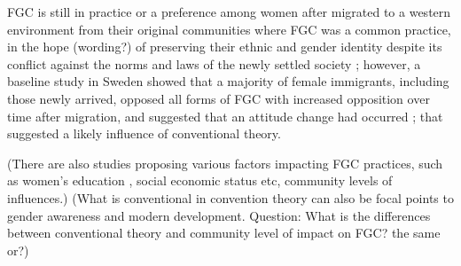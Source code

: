 \documentclass[12pt,]{article}
\begin{document}
FGC is still in practice or a preference among women after migrated to a western environment from their original communities where FGC was a common practice, in the hope (wording?) of preserving their ethnic and gender identity despite its conflict against the  norms and laws of the newly settled society \cite{}; however, a baseline study in Sweden showed that a majority of female immigrants, including those newly arrived, opposed all forms of FGC with increased opposition over time after migration, and suggested that an attitude change had occurred \cite{WahlJohn17}; that suggested a likely influence of conventional theory.


(There are also studies proposing various factors impacting FGC practices, such as women's education \cite{KandNwak09,VanMeek15}, social economic status \cite{} etc, community levels of influences.) (What is conventional in convention theory can also be focal points to gender awareness and modern development.  Question:  What is the differences between conventional theory and community level of impact on FGC? the same or?)  





\end{document}
